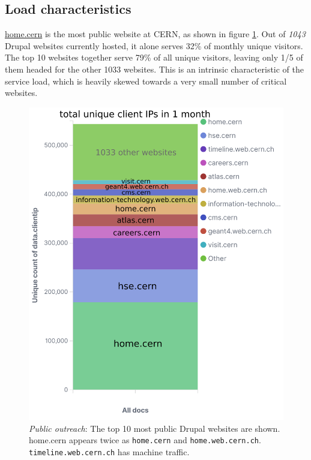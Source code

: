 \subsection{Load characteristics}

\href{https://home.cern/}{home.cern} is the most public website at CERN, as shown in figure \ref{fig-drp-top10-cip}.
Out of \emph{1043} Drupal websites currently hosted, it alone serves 32\% of monthly unique visitors.
The top 10 websites together serve 79\% of all unique visitors, leaving only 1/5 of them headed for the other 1033 websites.
This is an intrinsic characteristic of the service load, which is heavily skewed towards a very small number of critical websites.

\begin{figure}
\includegraphics[width=.50\textwidth]{figures/drupal-top10-uniqClientIP.png}
\caption{\emph{Public outreach}: 
    The top 10 most public Drupal websites are shown.
    home.cern appears twice as \texttt{home.cern} and \texttt{home.web.cern.ch}.
    {\color{amethyst} \texttt{timeline.web.cern.ch}} has machine traffic.}
\label{fig-drp-top10-cip}
\end{figure}

